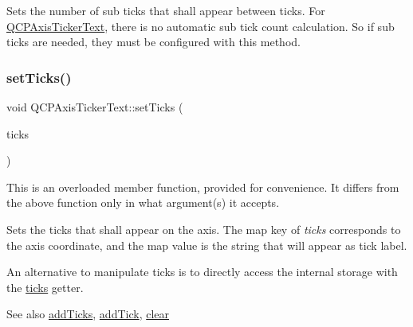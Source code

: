 Sets the number of sub ticks that shall appear between ticks. For \mbox{\hyperlink{class_q_c_p_axis_ticker_text}{Q\+C\+P\+Axis\+Ticker\+Text}}, there is no automatic sub tick count calculation. So if sub ticks are needed, they must be configured with this method. \mbox{\label{class_q_c_p_axis_ticker_text_a8cdf1f21940f1f53f5e3d30b2c74f5cf}} 
\subsubsection{\texorpdfstring{set\+Ticks()}{setTicks()}\hspace{0.1cm}{\footnotesize\ttfamily [1/2]}}
{\footnotesize\ttfamily void Q\+C\+P\+Axis\+Ticker\+Text\+::set\+Ticks (\begin{DoxyParamCaption}\item[{const Q\+Map$<$ double, Q\+String $>$ \&}]{ticks }\end{DoxyParamCaption})}

This is an overloaded member function, provided for convenience. It differs from the above function only in what argument(s) it accepts.

Sets the ticks that shall appear on the axis. The map key of {\itshape ticks} corresponds to the axis coordinate, and the map value is the string that will appear as tick label.

An alternative to manipulate ticks is to directly access the internal storage with the \mbox{\hyperlink{class_q_c_p_axis_ticker_text_ac84622a6bb4f2a98474e185ecaf3189a}{ticks}} getter.

\begin{DoxySeeAlso}{See also}
\mbox{\hyperlink{class_q_c_p_axis_ticker_text_aba34051300eecaefbedb2df8feff2d45}{add\+Ticks}}, \mbox{\hyperlink{class_q_c_p_axis_ticker_text_aada3db69e5fc6585aaa4ea5d89552eb0}{add\+Tick}}, \mbox{\hyperlink{class_q_c_p_axis_ticker_text_a21826d2fcd9a25c194d34d4f67aa1460}{clear}} 
\end{DoxySeeAlso}
\mbox{\label{class_q_c_p_axis_ticker_text_a69f3898cc1cf11d2437851f959faa1e8}} 
